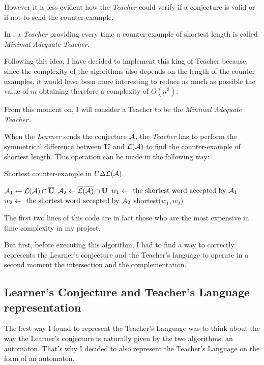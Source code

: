However it is less evident how the \textit{Teacher} could verify if a conjecture is valid or if not to send the counter-example.

\begin{definition}
  In \cite{LPaper}, a \textit{Teacher} providing every time a counter-example of shortest length is called \textit{Minimal Adequate Teacher}.
\end{definition}

Following this idea, I have decided to implement this king of Teacher because, since the complexity of the algorithms also depends on the length of the counter-examples, it would have been more interesting to reduce as much as possible the value of $m$ obtaining therefore a complexity of $O(n^3)$.

From this moment on, I will consider a Teacher to be the \textit{Minimal Adequate Teacher}.

When the \textit{Learner} sends the conjecture $\mathcal{A}$, the \textit{Teacher} has to perform the symmetrical difference between $\mathbf{U}$ and $\mathcal{L}(\mathcal{A})$ to find the counter-example of shortest length. This operation can be made in the following way:

\begin{algorithm}
  \caption{Shortest counter-example in $U \Delta \mathcal{L}(\mathcal{A})$}
  $\mathcal{A}_1 \gets \mathcal{L}(\mathcal{A}) \cap \overline{\mathbf{U}}$\;
  $\mathcal{A}_2 \gets \overline{\mathcal{L}(\mathcal{A})} \cap \mathbf{U}$\;
  $w_1 \gets \text{ the shortest word accepted by } \mathcal{A}_1$\;
  $w_2 \gets \text{ the shortest word accepted by } \mathcal{A}_2$\;
  \Return shortest($w_1, w_2$)\;
\end{algorithm}

The first two lines of this code are in fact those who are the most expensive in time complexity in my project.

But first, before executing this algorithm, I had to find a way to correctly represents the Learner's conjecture and the Teacher's language to operate in a second moment the intersection and the complementation.

\subsection{Learner's Conjecture and Teacher's Language representation}

The best way I found to represent the Teacher's Language was to think about the way the Learner's conjecture is naturally given by the two algorithms: an automaton. That's why I decided to also represent the Teacher's Language on the form of an automaton.

